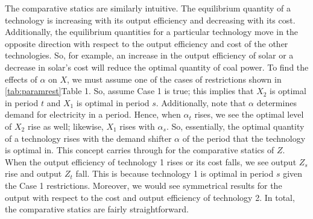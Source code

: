 \documentclass[11pt,a4paper]{extarticle}
\begin{document}
The comparative statics are similarly intuitive. The equilibrium quantity of a technology is increasing with its output efficiency and decreasing with its cost. Additionally, the equilibrium quantities for a particular technology move in the opposite direction with respect to the output efficiency and cost of the other technologies. So, for example, an increase in the output efficiency of solar or a decrease in solar's cost will reduce the optimal quantity of coal power. To find the effects of $\alpha$ on $X$, we must assume one of the cases of restrictions shown in \ref{tab:paramrest}{Table 1}. So, assume Case 1 is true; this implies that $X_2$ is optimal in period $t$ and $X_1$ is optimal in period $s$. Additionally, note that $\alpha$ determines demand for electricity in a period. Hence, when $\alpha_t$ rises, we see the optimal level of $X_2$ rise as well; likewise, $X_1$ rises with $\alpha_s$. So, essentially, the optimal quantity of a technology rises with the demand shifter $\alpha$ of the period that the technology is optimal in. This concept carries through for the comparative statics of $Z$. When the output efficiency of technology 1 rises or its cost falls, we see output $Z_s$ rise and output $Z_t$ fall. This is because technology 1 is optimal in period $s$ given the Case 1 restrictions. Moreover, we would see symmetrical results for the output with respect to the cost and output efficiency of technology 2. In total, the comparative statics are fairly straightforward. 
\end{document}
